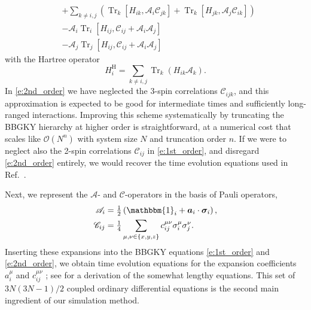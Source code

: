 \documentclass[aps,prl,showpacs,amsmath,amssymb,superscriptaddress,reprint,10pt]{revtex4-1}
\newcommand\id{{\mathbbm{1}}}
\newcommand{\mvec}[1]{\boldsymbol #1}
\newcommand{\Com}[2]{\left[{#1},{#2}\right]}
\DeclareMathOperator{\Tr}{{Tr}}
\begin{document}
\begin{bibunit}
\begin{subequations}
\begin{align}
&+\sum_{k\neq i,j}\left(\Tr_k\Com{H_{ik}}{\mathscr{A}_i \mathscr{C}_{jk}}+\Tr_k\Com{H_{jk}}{\mathscr{A}_j \mathscr{C}_{ik}}\right)\nonumber\\
&-\mathscr{A}_i\Tr_i\Com{H_{ij}}{\mathscr{C}_{ij}+\mathscr{A}_i \mathscr{A}_j}\nonumber\\
&-\mathscr{A}_j\Tr_j\Com{H_{ij}}{\mathscr{C}_{ij}+\mathscr{A}_i \mathscr{A}_j}\label{e:2nd_order}
\end{align}
\end{subequations}
with the Hartree operator
\begin{equation}
 H_i^\text{H}=\sum_{k\neq i,j}\Tr_k\left(H_{ik} \mathscr{A}_k\right).
\end{equation}
In \eqref{e:2nd_order} we have neglected the 3-spin correlations $\mathscr{C}_{ijk}$, and this approximation is expected to be good for intermediate times and sufficiently long-ranged interactions. Improving this scheme systematically by truncating the BBGKY hierarchy at higher order is straightforward, at a numerical cost that scales like $\mathscr{O}\left(N^n\right)$ with system size $N$ and truncation order $n$. If we were to neglect also the 2-spin correlations $\mathscr{C}_{ij}$ in \eqref{e:1st_order}, and disregard \eqref{e:2nd_order} entirely, we would recover the time evolution equations used in Ref.~\cite{Schachenmayer_etal15}.

Next, we represent the $\mathscr{A}$- and $\mathscr{C}$-operators in the basis of Pauli operators,
\begin{subequations}
\begin{align}
\mathscr{A}_i &= \tfrac{1}{2}\left(\id_i+\mvec{a}_i\cdot\mvec{\sigma}_i\right),\label{e:Aexp}\\
\mathscr{C}_{ij} &= \tfrac{1}{4}\sum_{\mu,\nu\in\{x,y,z\}}c_{ij}^{\mu\nu}\sigma_i^\mu\sigma_j^\nu.\label{e:Cexp}
\end{align}
\end{subequations}
Inserting these expansions into the BBGKY equations \eqref{e:1st_order} and \eqref{e:2nd_order}, we obtain time evolution equations for the expansion coefficients $a_i^\mu$ and $c_{ij}^{\mu\nu}$ \cite{PaskauskasKastner12}; see \cite{Note1} for a derivation of the somewhat lengthy equations. This set of $3N(3N-1)/2$ coupled ordinary differential equations is the second main ingredient of our simulation method.


\end{bibunit}
\end{document}
